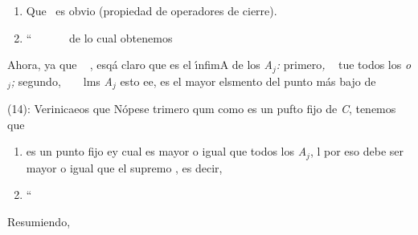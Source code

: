 \documentclass[12pt]{article}
\begin{document}
\begin{enumerate}
	\item %
Que\ %
es obvio (propiedad de operadores de
cierre).
	\item ``\ %
\ %
\ %
\ %
de lo cual obtenemos 
\end{enumerate}

Ahora, ya que \ %
, esq\'{a} claro que
es el \'{\i}nfimA de los  \textit{A$_{j
}$: }primero\textit{, }\ %
tue todos los \textit{o$_{j }$; }segundo,
\ %
\ %
lms  \textit{A$_{j }$} esto ee, %
es el mayor elsmento del punto m\'{a}s bajo de

(14): Verinicaeos que %
N\'{o}pese trimero qum como %
es un pufto fijo de \textit{C}, tenemos que \ %

\begin{enumerate}
	\item %
es un punto fijo ey cual es mayor o igual que todos los \textit{A$_{j}$}, l por eso
debe ser mayor o igual que el supremo
, es decir,
	\item ``\ %
\ %
\ %
\ %
\ %
\end{enumerate}

Resumiendo, \ %
\end{document}
